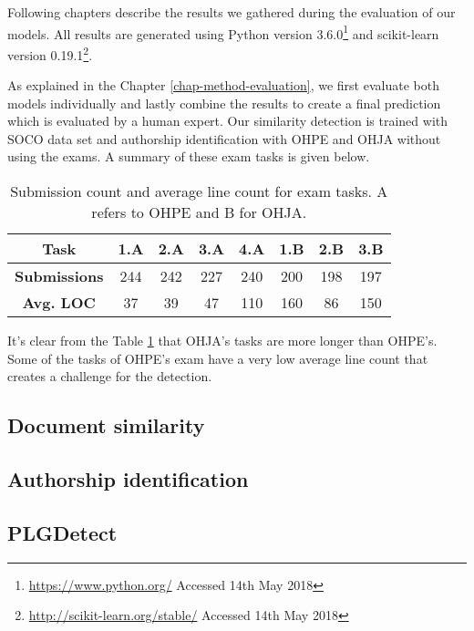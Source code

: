 
Following chapters describe the results we gathered during the evaluation of our models. All results are generated using Python version 3.6.0\footnote{\url{https://www.python.org/} Accessed 14th May 2018} and scikit-learn version 0.19.1\footnote{\url{http://scikit-learn.org/stable/} Accessed 14th May 2018}. 

As explained in the Chapter \ref{chap-method-evaluation}, we first evaluate both models individually and lastly combine the results to create a final prediction which is evaluated by a human expert. Our similarity detection is trained with SOCO data set and authorship identification with OHPE and OHJA without using the exams. A summary of these exam tasks is given below.

\begin{table}[ht]
\centering
\caption{Submission count and average line count for exam tasks. A refers to OHPE and B for OHJA.}
\label{tbl-exam-data}
\begin{tabular}{|c||c|c|c|c|c|c|c|}
\hline
\bf Task        & 1.A & 2.A & 3.A & 4.A & 1.B & 2.B & 3.B \\ \hline
\bf Submissions & 244 & 242 & 227 & 240 & 200 & 198 & 197 \\ \hline
\bf Avg. LOC    & 37  & 39  & 47  & 110 & 160 & 86  & 150 \\ \hline
\end{tabular}
\end{table}

\noindent
It's clear from the Table \ref{tbl-exam-data} that OHJA's tasks are more longer than OHPE's. Some of the tasks of OHPE's exam have a very low average line count that creates a challenge for the detection.

\subsection{Document similarity} \label{chap-sd-result}



\subsection{Authorship identification}


\subsection{PLGDetect}

